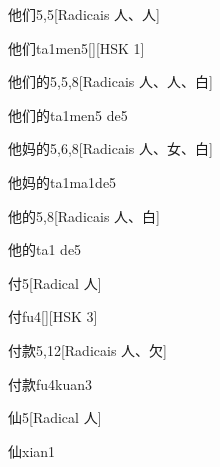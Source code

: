 \begin{entry}{他们}{5,5}[Radicais ⼈、⼈]
  \begin{phonetics}{他们}{ta1men5}[][HSK 1]
  \end{phonetics}
\end{entry}

\begin{entry}{他们的}{5,5,8}[Radicais ⼈、⼈、⽩]
  \begin{phonetics}{他们的}{ta1men5 de5}
  \end{phonetics}
\end{entry}

\begin{entry}{他妈的}{5,6,8}[Radicais ⼈、⼥、⽩]
  \begin{phonetics}{他妈的}{ta1ma1de5}
  \end{phonetics}
\end{entry}

\begin{entry}{他的}{5,8}[Radicais ⼈、⽩]
  \begin{phonetics}{他的}{ta1 de5}
  \end{phonetics}
\end{entry}

\begin{entry}{付}{5}[Radical ⼈]
  \begin{phonetics}{付}{fu4}[][HSK 3]
  \end{phonetics}
\end{entry}

\begin{entry}{付款}{5,12}[Radicais ⼈、⽋]
  \begin{phonetics}{付款}{fu4kuan3}
  \end{phonetics}
\end{entry}

\begin{entry}{仙}{5}[Radical ⼈]
  \begin{phonetics}{仙}{xian1}
  \end{phonetics}
\end{entry}

